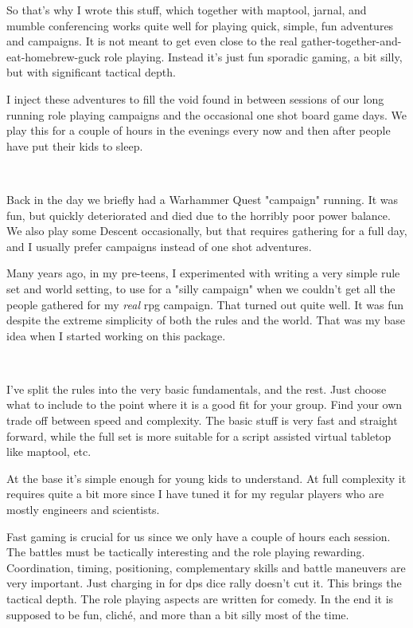 \documentclass[11pt, twoside, titlepage, a4paper]{report}
\begin{document}
So that's why I wrote this stuff, which together with maptool, jarnal, and mumble conferencing works quite well for playing quick, simple, fun adventures and campaigns. It is not meant to get even close to the real gather-together-and-eat-homebrew-guck role playing. Instead it's just fun sporadic gaming, a bit silly, but with significant tactical depth.

I inject these adventures to fill the void found in between sessions of our long running role playing campaigns and the occasional one shot board game days.
We play this for a couple of hours in the evenings every now and then after people have put their kids to sleep.

\

Back in the day we briefly had a Warhammer Quest "campaign" running. It was fun, but quickly deteriorated and died due to the horribly poor power balance. We also play some Descent occasionally, but that requires gathering for a full day, and I usually prefer campaigns instead of one shot adventures.

Many years ago, in my pre-teens, I experimented with writing a very simple rule set and world setting, to use for a "silly campaign" when we couldn't get all the people gathered for my \emph{real} rpg campaign. That turned out quite well. It was fun despite the extreme simplicity of both the rules and the world. That was my base idea when I started working on this package.

\

I've split the rules into the very basic fundamentals, and the rest. Just choose what to include to the point where it is a good fit for your group. Find your own trade off between speed and complexity. The basic stuff is very fast and straight forward, while the full set is more suitable for a script assisted virtual tabletop like maptool, etc.

At the base it's simple enough for young kids to understand. At full complexity it requires quite a bit more since I have tuned it for my regular players who are mostly engineers and scientists.

Fast gaming is crucial for us since we only have a couple of hours each session. The battles must be tactically interesting and the role playing rewarding. Coordination, timing, positioning, complementary skills and battle maneuvers are very important. Just charging in for dps dice rally doesn't cut it. This brings the tactical depth. The role playing aspects are written for comedy. In the end it is supposed to be fun, cliché, and more than a bit silly most of the time.
\end{document}
